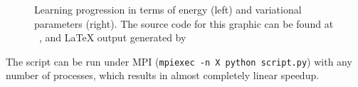 \documentclass[Thesis.tex]{subfiles}
\begin{document}
\begin{figure}[h]
  \centering
      
  \caption{Learning progression in terms of energy (left) and variational
    parameters (right). The source code for this graphic can be found
    at ~\cite[TODO: Add
    path]{MS-thesis-repository}, and \LaTeX{} output generated
    by~\cite{nico_schlomer_2018_1173090}}
  \label{fig:quickstart-example}
\end{figure}

\noindent The script can be run under MPI (\texttt{mpiexec -n X python script.py}) with any number of processes, which
results in almost completely linear speedup.
\end{document}
